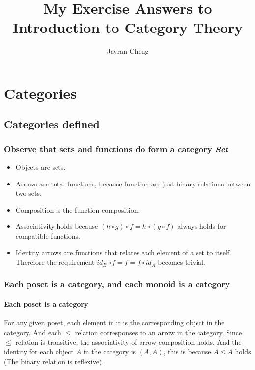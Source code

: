 \documentclass[11pt]{article}
\title{My Exercise Answers to \\
Introduction to Category Theory}
\author{Javran Cheng}
\begin{document}
\maketitle

\newcommand{\cat}[1]{\textit{#1}}
\newcommand{\fcomp}{\circ}

\newcommand{\nat}{\mathbb{N}}

\section{Categories}

\subsection{Categories defined}

\subsubsection{Observe that sets and functions do form a category \cat{Set}}

\begin{itemize}
  \item Objects are sets.
  \item Arrows are total functions, because function are just binary relations
    between two sets.
  \item Composition is the function composition.
  \item Associativity holds because $(h \fcomp g) \fcomp f = h \fcomp (g \fcomp f)$
    always holds for compatible functions.
  \item Identity arrows are functions that relates each element of a set to itself.
    Therefore the requirement $id_B \fcomp f = f = f \fcomp id_A$ becomes trivial.
\end{itemize}

\subsubsection{Each poset is a category, and each monoid is a category}

\paragraph{Each poset is a category} For any given poset, each element in it
is the corresponding object in the category. And each $\le$ relation corresponses
to an arrow in the category. Since $\le$ relation is transitive, the associativity
of arrow composition holds. And the identity for each object $A$ in the category is $(A,A)$,
this is because $A \le A$ holds (The binary relation is reflexive).
\end{document}
